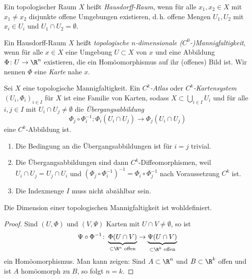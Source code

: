 \documentclass[11pt]{article}
\begin{document}
\begin{definition}\Theorem
  Ein topologischer Raum $X$ heißt \emph{Hausdorff-Raum}, wenn für alle $x_1, x_2 \in X$ mit $x_1 \neq x_2$ disjunkte offene Umgebungen existieren, d.\,h. offene Mengen $U_1, U_2$ mit $x_i \in U_i$ und $U_1 \cap U_2 = \emptyset$.
\end{definition}

\begin{definition}\Theorem
  Ein Hausdorff-Raum $X$ heißt \emph{topologische $n$-dimensionale ($C^0$-)Mannigfaltigkeit}, wenn für alle $x \in X$ eine Umgebung $U \subset X$ von $x$ und eine Abbildung $\Phi\colon U \to \R^n$ existieren, die ein Homöomorphismus auf ihr (offenes) Bild ist.
  Wir nennen $\Phi$ eine \emph{Karte} nahe $x$.
\end{definition}

\begin{definition}[Atlas]\Theorem
  Sei $X$ eine topologische Mannigfaltigkeit. Ein \emph{$C^k$-Atlas} oder \emph{$C^k$-Kartensystem} $(U_i, \Phi_i)_{i \in I}$ für $X$ ist eine Familie von Karten, sodass $X \subset \bigcup_{i \in I} U_i$ und für alle $i, j \in I$ mit $U_i \cap U_j \neq \emptyset$ die \emph{Übergangsabbildung}
  \[ \Phi_j \circ \Phi_i^{-1}\colon \Phi_i(U_i \cap U_j) \to \Phi_j(U_i \cap U_j) \]
  eine $C^k$-Abbildung ist.
\end{definition}

\begin{note}
  \begin{enumerate}[label=(\roman*)]
    \item Die Bedingung an die Übergangsabbildungen ist für $i = j$ trivial.
    \item Die Übergangsabbildungen sind dann $C^k$-Diffeomorphismen, weil $U_i \cap U_j = U_j \cap U_i$ und $(\Phi_j \circ \Phi_i^{-1})^{-1} = \Phi_i \circ \Phi_j^{-1}$ nach Voraussetzung $C^k$ ist.
    \item Die Indexmenge $I$ muss nicht abzählbar sein.
  \end{enumerate}
\end{note}

\begin{note}
  Die Dimension einer topologischen Mannigfaltigkeit ist wohldefiniert.
\end{note}

\begin{proof}
  Sind $(U, \Phi)$ und $(V, \Psi)$ Karten mit $U \cap V \neq \emptyset$, so ist
  \[ \Psi \circ \Phi^{-1}\colon \underbrace{\Phi(U \cap V)}_{\subset \R^n \text{ offen}} \to \underbrace{\Psi(U \cap V)}_{\subset \R^k \text{ offen}} \]
  ein Homöomorphismus. Man kann zeigen: Sind $A \subset \R^n$ und $B \subset \R^k$ offen und ist $A$ homöomorph zu $B$, so folgt $n = k$.
\end{proof}
\end{document}
